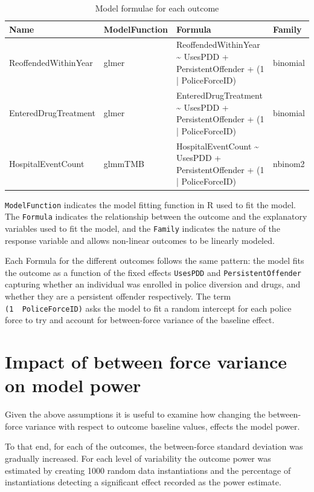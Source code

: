 \documentclass[
]{article}
\begin{document}
\begin{table}[H]

\caption{\label{tab:models}Model formulae for each outcome}
\centering
\begin{tabular}[t]{ll>{\raggedright\arraybackslash}p{6.5cm}l}
\toprule
Name & ModelFunction & Formula & Family\\
\midrule
ReoffendedWithinYear & glmer & ReoffendedWithinYear \textasciitilde{} UsesPDD + PersistentOffender + (1 | PoliceForceID) & binomial\\
EnteredDrugTreatment & glmer & EnteredDrugTreatment \textasciitilde{} UsesPDD + PersistentOffender + (1 | PoliceForceID) & binomial\\
HospitalEventCount & glmmTMB & HospitalEventCount \textasciitilde{} UsesPDD + PersistentOffender + (1 | PoliceForceID) & nbinom2\\
\bottomrule
\end{tabular}
\end{table}

\texttt{ModelFunction} indicates the model fitting function in R used to fit the model. The \texttt{Formula} indicates the relationship between the outcome and the explanatory variables used to fit the model, and the \texttt{Family} indicates the nature of the response variable and allows non-linear outcomes to be linearly modeled.

Each Formula for the different outcomes follows the same pattern: the model fits the outcome as a function of the fixed effects \texttt{UsesPDD} and \texttt{PersistentOffender} capturing whether an individual was enrolled in police diversion and drugs, and whether they are a persistent offender respectively. The term \texttt{(1\ \textbar{}\ PoliceForceID)} asks the model to fit a random intercept for each police force to try and account for between-force variance of the baseline effect.

\hypertarget{impact-of-between-force-variance-on-model-power}{%
\section{Impact of between force variance on model power}\label{impact-of-between-force-variance-on-model-power}}

Given the above assumptions it is useful to examine how changing the between-force variance with respect to outcome baseline values, effects the model power.

To that end, for each of the outcomes, the between-force standard deviation was gradually increased. For each level of variability the outcome power was estimated by creating 1000 random data instantiations and the percentage of instantiations detecting a significant effect recorded as the power estimate.
\end{document}
